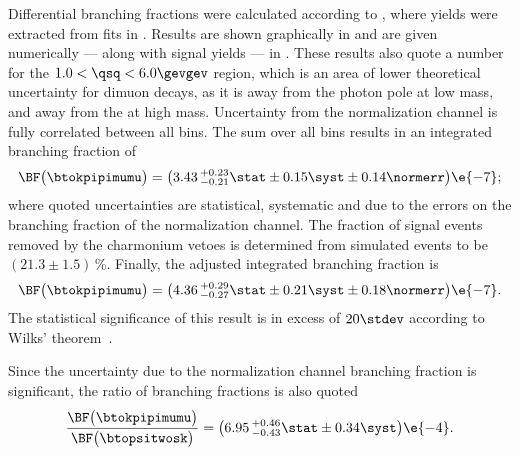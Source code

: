 Differential branching fractions were calculated according to , where yields
were extracted from fits in .
Results are shown graphically in  and are given numerically --- along
with signal yields --- in .
These results also quote a number for the $1.0<\qsq<6.0\gevgev$ region, which is an area of lower
theoretical uncertainty for dimuon \fcnc decays, as it is away from the photon pole at low mass,
and away from the \jpsi at high mass.
Uncertainty from the normalization channel is fully correlated between all \qsq bins.
The sum over all \qsq bins results in an integrated branching fraction of
\begin{equation*}
  \BF\big( \btokpipimumu \big)=
  \big(3.43\,^{+0.23}_{-0.21}\stat\pm0.15\syst\pm0.14\normerr\big)\e{-7};
\end{equation*}
where quoted uncertainties are statistical, systematic and due to the errors on the branching
fraction of the normalization channel.
The fraction of signal events removed by the charmonium vetoes is determined from simulated
 events %
to be $(21.3\pm1.5)\,\%$.
Finally, the adjusted integrated branching fraction is
\begin{equation*}
  \BF\big( \btokpipimumu \big)=
  \big(4.36\,^{+0.29}_{-0.27}\stat\pm0.21\syst\pm0.18\normerr\big)\e{-7}.
\end{equation*}
The statistical significance of this result is in excess of $20\stdev$ according to Wilks'
theorem~\cite{wilks1938}.

Since the uncertainty due to the normalization channel branching fraction is significant, the
ratio of branching fractions is also quoted
\begin{equation*}
  \frac{ \BF\big( \btokpipimumu \big) }{ \BF\big( \btopsitwosk \big) } =
  \big(6.95\,^{+0.46}_{-0.43}\stat\pm0.34\syst\big)\e{-4}.
\end{equation*}


